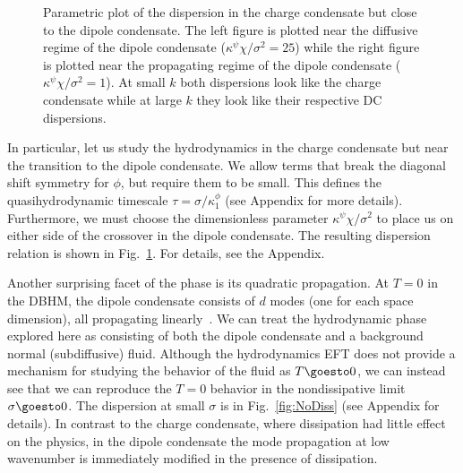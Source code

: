 \begin{figure}[th!]
    \centering
    \caption[Parametric plot of the dispersion in the charge condensate]{Parametric plot of the dispersion in the charge condensate but close to the dipole condensate. The left figure is plotted near the diffusive regime of the dipole condensate ($\kappa^{\psi}\chi/\sigma^2=25$) while the right figure is plotted near the propagating regime of the dipole condensate ($\kappa^{\psi}\chi/\sigma^2=1$). At small $k$ both dispersions look like the charge condensate while at large $k$ they look like their respective DC dispersions.}
    \label{fig:CCtoDC}
\end{figure}

In particular, let us study the hydrodynamics in the charge condensate but near the transition to the dipole condensate. We allow terms that break the diagonal shift symmetry for $\phi$, but require them to be small. This defines the quasihydrodynamic timescale $\tau = \sigma/\kappa^\phi_1$ (see Appendix for more details). Furthermore, we must choose the dimensionless parameter $\kappa^{\psi}\chi/\sigma^2$ to place us on either side of the crossover in the dipole condensate. 
The resulting dispersion relation is shown in Fig.~\ref{fig:CCtoDC}. For details, see the Appendix.

Another surprising facet of the phase is its quadratic propagation. At $T=0$ in the DBHM, the dipole condensate consists of $d$ modes (one for each space dimension), all propagating linearly~\cite{Stahl2022Spontaneous,Lake2022Dipolar}. We can treat the hydrodynamic phase explored here as consisting of both the dipole condensate and a background normal (subdiffusive) fluid. Although the hydrodynamics EFT does not provide a mechanism for studying the behavior of the fluid as $T \goesto 0$, we can instead see that we can reproduce the $T=0$ behavior in the nondissipative limit $\sigma \goesto 0$. The dispersion at small $\sigma$ is in Fig.~\ref{fig:NoDiss} (see Appendix for details). In contrast to the charge condensate, where dissipation had little effect on the physics, in the dipole condensate the mode propagation at low wavenumber is immediately modified in the presence of dissipation. 

